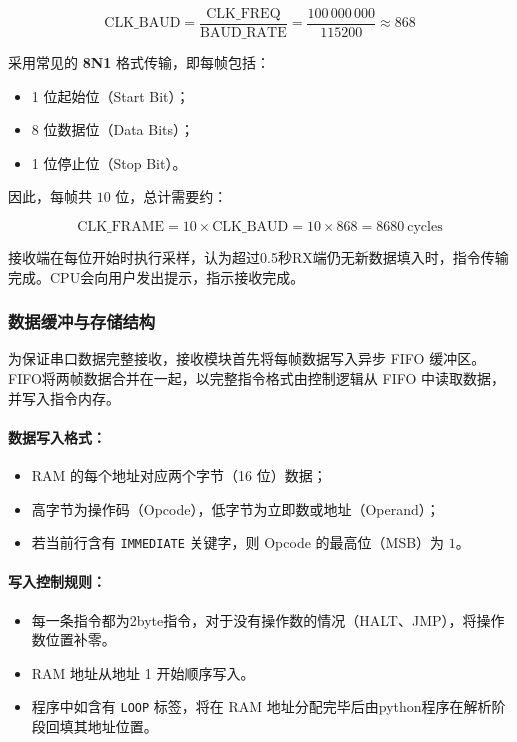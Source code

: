 \documentclass[lang=cn,a4paper,newtx]{elegantpaper}
\begin{document}
\begin{equation}
  \text{CLK\_BAUD} = \frac{\text{CLK\_FREQ}}{\text{BAUD\_RATE}} = \frac{100\,000\,000}{115200} \approx 868
\end{equation}

采用常见的 \textbf{8N1} 格式传输，即每帧包括：

\begin{itemize}
  \item 1 位起始位（Start Bit）；
  \item 8 位数据位（Data Bits）；
  \item 1 位停止位（Stop Bit）。
\end{itemize}

因此，每帧共 $10$ 位，总计需要约：

\begin{equation}
  \text{CLK\_FRAME} = 10 \times \text{CLK\_BAUD} = 10 \times 868 = 8680\ \text{cycles}
\end{equation}

接收端在每位开始时执行采样，认为超过0.5秒RX端仍无新数据填入时，指令传输完成。CPU会向用户发出提示，指示接收完成。

\subsubsection{数据缓冲与存储结构}

为保证串口数据完整接收，接收模块首先将每帧数据写入异步 FIFO 缓冲区。FIFO将两帧数据合并在一起，以完整指令格式由控制逻辑从 FIFO 中读取数据，并写入指令内存。

\paragraph{数据写入格式：}

\begin{itemize}
  \item RAM 的每个地址对应两个字节（16 位）数据；
  \item 高字节为操作码（Opcode），低字节为立即数或地址（Operand）；
  \item 若当前行含有 \texttt{IMMEDIATE} 关键字，则 Opcode 的最高位（MSB）为 $1$。
\end{itemize}

\paragraph{写入控制规则：}

\begin{itemize}
  \item 每一条指令都为2byte指令，对于没有操作数的情况（HALT、JMP），将操作数位置补零。
  \item RAM 地址从地址 1 开始顺序写入。
  \item 程序中如含有 \texttt{LOOP} 标签，将在 RAM 地址分配完毕后由python程序在解析阶段回填其地址位置。
\end{itemize}
\end{document}
